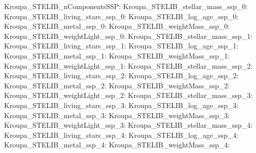 Kroupa\_STELIB\_nComponentsSSP:  \newline 
Kroupa\_STELIB\_stellar\_mass\_ssp\_0:  \newline 
Kroupa\_STELIB\_living\_stars\_ssp\_0:  \newline 
Kroupa\_STELIB\_log\_age\_ssp\_0:  \newline 
Kroupa\_STELIB\_metal\_ssp\_0:  \newline 
Kroupa\_STELIB\_weightMass\_ssp\_0:  \newline 
Kroupa\_STELIB\_weightLight\_ssp\_0:  \newline 
Kroupa\_STELIB\_stellar\_mass\_ssp\_1:  \newline 
Kroupa\_STELIB\_living\_stars\_ssp\_1:  \newline 
Kroupa\_STELIB\_log\_age\_ssp\_1:  \newline 
Kroupa\_STELIB\_metal\_ssp\_1:  \newline 
Kroupa\_STELIB\_weightMass\_ssp\_1:  \newline 
Kroupa\_STELIB\_weightLight\_ssp\_1:  \newline 
Kroupa\_STELIB\_stellar\_mass\_ssp\_2:  \newline 
Kroupa\_STELIB\_living\_stars\_ssp\_2:  \newline 
Kroupa\_STELIB\_log\_age\_ssp\_2:  \newline 
Kroupa\_STELIB\_metal\_ssp\_2:  \newline 
Kroupa\_STELIB\_weightMass\_ssp\_2:  \newline 
Kroupa\_STELIB\_weightLight\_ssp\_2:  \newline 
Kroupa\_STELIB\_stellar\_mass\_ssp\_3:  \newline 
Kroupa\_STELIB\_living\_stars\_ssp\_3:  \newline 
Kroupa\_STELIB\_log\_age\_ssp\_3:  \newline 
Kroupa\_STELIB\_metal\_ssp\_3:  \newline 
Kroupa\_STELIB\_weightMass\_ssp\_3:  \newline 
Kroupa\_STELIB\_weightLight\_ssp\_3:  \newline 
Kroupa\_STELIB\_stellar\_mass\_ssp\_4:  \newline 
Kroupa\_STELIB\_living\_stars\_ssp\_4:  \newline 
Kroupa\_STELIB\_log\_age\_ssp\_4:  \newline 
Kroupa\_STELIB\_metal\_ssp\_4:  \newline 
Kroupa\_STELIB\_weightMass\_ssp\_4:  \newline 
